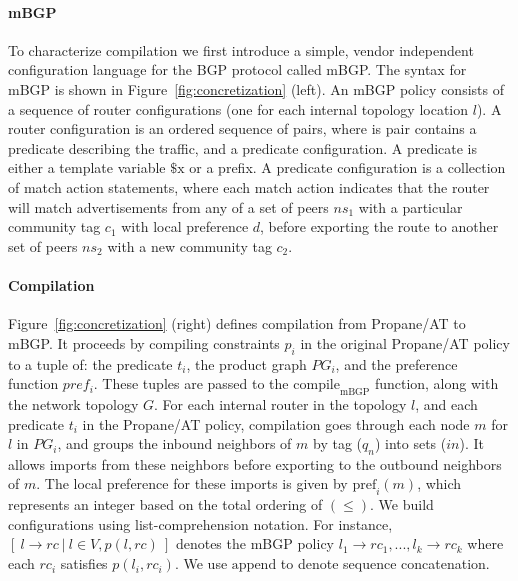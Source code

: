 \documentclass[numbers, 10pt]{sigplanconf}
\newcommand{\sysname}{{\text{}\small \sf Propane/AT}\xspace}
\newcommand{\mbgp}{{\small \sf mBGP}\xspace}
\newcommand{\para}[1]{\paragraph*{\textbf{#1}}}
\begin{document}
\para{mBGP}
To characterize compilation we first introduce a simple, vendor independent configuration language for the BGP protocol called \mbgp. The syntax for \mbgp is shown in Figure~\ref{fig:concretization} (left). An \mbgp policy consists of a sequence of router configurations (one for each internal topology location $l$). A router configuration is an ordered sequence of pairs, where is pair contains
a predicate describing the traffic, and a predicate configuration. A predicate is either a template variable $\$\mathrm{x}$ or a prefix. A predicate configuration is a collection of match action statements, where each match action indicates that the router will match advertisements from any of a set of peers $ns_1$ with a particular community tag $c_1$ with local preference $d$, before exporting the route to another set of peers $ns_2$ with a new community tag $c_2$.


\para{Compilation}

Figure~\ref{fig:concretization} (right) defines compilation from \sysname to \mbgp. It proceeds by compiling constraints $p_i$ in the original \sysname policy to a tuple of: the predicate $t_i$, the product graph $PG_i$, and the preference function $pref_i$. These tuples are passed to the $\mathrm{compile}_\mathrm{mBGP}$ function, along with the network topology $G$. For each internal router in the topology $l$, and each predicate $t_i$ in the \sysname policy, compilation goes through each node $m$ for $l$ in $PG_i$, and groups the inbound neighbors of $m$ by tag ($q_n$) into sets ($in$). It allows imports from these neighbors before exporting to the outbound neighbors of $m$. The local preference for these imports is given by $\mathrm{pref}_i(m)$, which represents an integer based on the total ordering of $(\leq)$. We build configurations using list-comprehension notation. For instance, $[~ l \rightarrow rc ~\vert~ l \in V, p(l,rc) ~]$ denotes the \mbgp policy $l_1 \rightarrow rc_{1},...,l_k \rightarrow rc_{k}$ where each $rc_{i}$ satisfies $p(l_i,rc_{i})$. We use $\mathrm{append}$ to denote sequence concatenation.%
\end{document}
